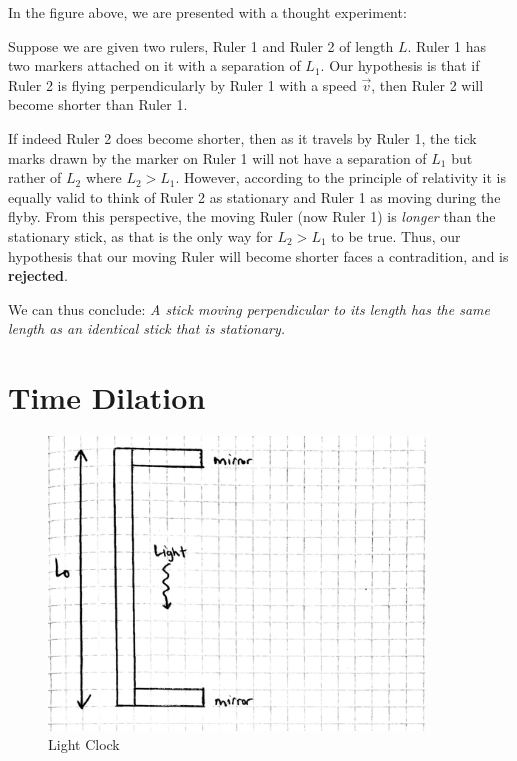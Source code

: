 \documentclass{article}
\begin{document}
In the figure above, we are presented with a thought experiment:

\vspace{2mm}

Suppose we are given two rulers, Ruler 1 and Ruler 2 of length \(L\). Ruler 1 has two markers attached on it with a separation of \(L_1\). Our hypothesis is that if Ruler 2 is flying perpendicularly by Ruler 1 with a speed \(\vec{v}\), then Ruler 2 will become shorter than Ruler 1.

If indeed Ruler 2 does become shorter, then as it travels by Ruler 1, the tick marks drawn by the marker on Ruler 1 will not have a separation of \(L_1\) but rather of \(L_2\) where \(L_2 > L_1\). However, according to the principle of relativity it is equally valid to think of Ruler 2 as stationary and Ruler 1 as moving during the flyby. From this perspective, the moving Ruler (now Ruler 1) is \textit{longer} than the stationary stick, as that is the only way for \(L_2 > L_1\) to be true. Thus, our hypothesis that our moving Ruler will become shorter faces a contradition, and is \textbf{rejected}.

\vspace{2mm}

We can thus conclude: \textit{
  A stick moving perpendicular to its length has the same length as an identical stick that is stationary.
}

\newpage
\section{Time Dilation}

\begin{figure}[!htb]
  \centering
  \includegraphics[width=100mm]{lightclock}\par
  \caption{Light Clock}
\end{figure}
\end{document}
